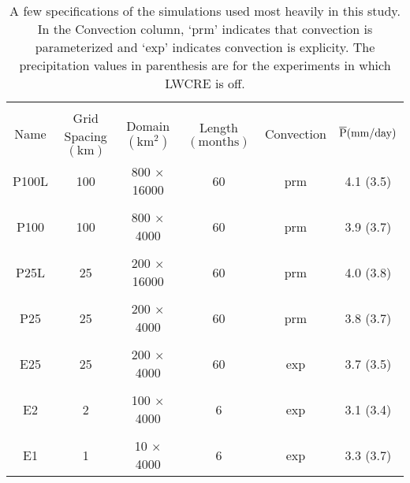 \documentclass[11pt]{article}   	%
\begin{document}
\begin{table}
\begin{center}
\caption{A few specifications of the simulations used most heavily in this study.  In the Convection
column, `prm'  indicates that convection is parameterized and `exp' indicates convection is explicity.  
The precipitation values in parenthesis are for the experiments in which LWCRE is off.}
    \begin{tabular}{*{6}{c}}
    \hline
    \hline
    \\
 Name & Grid Spacing $(\mathrm{km})$ & Domain $ (\mathrm{km^2}) $& Length $(\mathrm{months}) $ & Convection & 
 $\overline{\rm{P}} (\mathrm{mm/day})$    \\ \hline
  P100L &  100          &   800 $\times$ 16000    &  60              & prm           &  4.1 (3.5)          \\ 
    \\
  P100 &  100                & 800 $\times$ 4000     & 60            & prm         & 3.9 (3.7)               \\  
    \\
  P25L &  25             & 200 $\times$ 16000      & 60             & prm          & 4.0 (3.8)                \\  
    \\
  P25  &  25             & 200 $\times$ 4000      & 60             & prm           & 3.8 (3.7)               \\  
    \\
 E25  &   25          & 200 $\times$ 4000      & 60             & exp          & 3.7 (3.5)               \\  
    \\
 E2   &   2          & 100 $\times$ 4000      & 6             & exp          & 3.1 (3.4)                \\ 
    \\
 E1   &   1          & 10 $\times$ 4000      & 6             & exp          & 3.3 (3.7)                \\  \hline

    \end{tabular}\par
    \label{tab:lambda}
\end{center}
\end{table}
\end{document}
